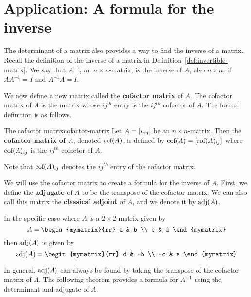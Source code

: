 \section{Application: A formula for the inverse}

The determinant of a matrix also provides a way to find the inverse of a matrix.
Recall the definition of the inverse of a matrix in Definition~\ref{def:invertible-matrix}.
We say that $A^{-1}$, an $n \times n$-matrix, is the inverse of $A$, also $n \times n$, if $AA^{-1} = I$ and $A^{-1}A=I$. 

We now define a new matrix called the \textbf{cofactor matrix} of $A$.  
The cofactor matrix of $A$ is the matrix whose $ij^{th}$ entry is the $ij^{th}$ cofactor of $A$.
The formal definition is as follows.

\begin{definition}{The cofactor matrix}{cofactor-matrix}
Let $A=\left[a_{ij}\right]$ be an $n\times n$-matrix. Then the
\textbf{cofactor matrix of $A$}, denoted 
$\mbox{\rm cof}(A)$, is defined by $\mbox{\rm cof}(A) =\left[
\mbox{\rm cof}(A)_{ij}\right] $ where  $\mbox{\rm cof}(A)_{ij}$ is the $ij^{th}$ cofactor of $A$.
\end{definition}

Note that $\mbox{\rm cof}(A)_{ij}$ denotes the $ij^{th}$ entry of the cofactor matrix.

We will use the cofactor matrix to create a formula for the inverse of $A$. First,
we define the \textbf{adjugate} of $A$ to be the transpose of 
the cofactor matrix. We can also call this matrix the \textbf{classical adjoint} of $A$,
and we denote it by $\mbox{\rm adj} (A)$. 

In the specific case where $A$ is a $2 \times 2$-matrix given by
\begin{equation*}
A = \begin{mymatrix}{rr}
a & b \\
c & d
\end{mymatrix}
\end{equation*}
then $\mbox{\rm adj}(A)$ is given by
\begin{equation*}
\func{adj}(A) = 
\begin{mymatrix}{rr}
d & -b \\
-c & a
\end{mymatrix}
\end{equation*}

In general, $\mbox{\rm adj}(A)$ can always be found by taking the transpose of the cofactor matrix of $A$. The following theorem provides a formula for $A^{-1}$ using the determinant and adjugate of $A$.


